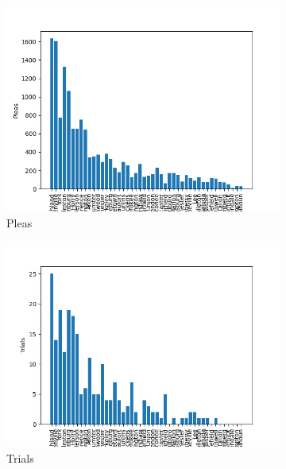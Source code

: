 \documentclass[11pt]{article}
\begin{document}
    \begin{figure}[H]
      \centering
        \begin{subfigure}[b]{0.45\textwidth}
          \includegraphics[width=\textwidth]{../../../output/figures/Exploration/county_pleas.png}
          \caption{Pleas}
        \end{subfigure}
        \hfill
        \begin{subfigure}[b]{0.45\textwidth}
          \includegraphics[width=\textwidth]{../../../output/figures/Exploration/county_trials.png}
          \caption{Trials}

        \end{subfigure}
        \begin{subfigure}[b]{0.45\textwidth}


\end{subfigure}
\end{figure}
\end{document}
